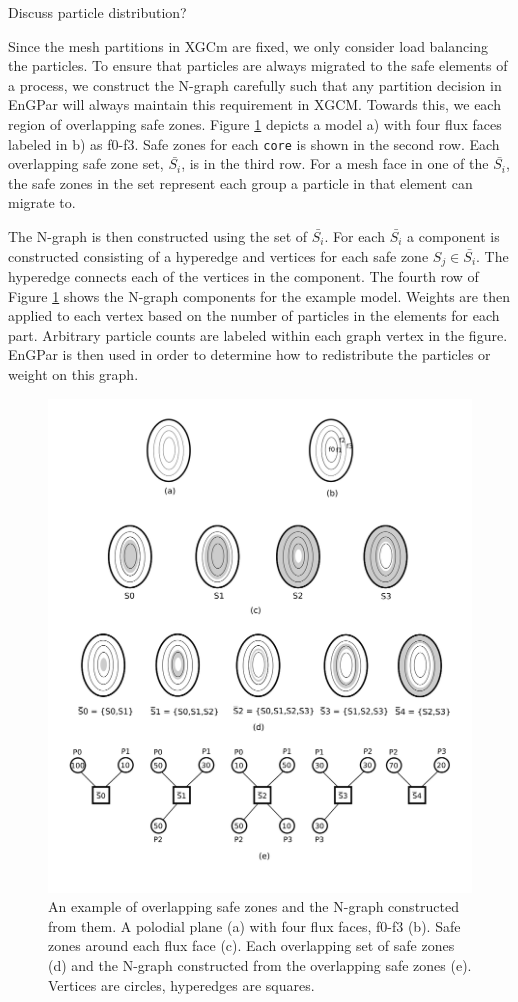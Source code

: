 \documentclass[conference]{IEEEtran}
\begin{document}
{\color{red} Discuss particle distribution?}

Since the mesh partitions in XGCm are fixed, we only consider
load balancing the particles. To ensure that particles are always migrated to the safe elements
of a process, we construct the N-graph carefully such that any partition
decision in EnGPar will always maintain this requirement in XGCM. Towards this, we each region
of overlapping safe zones. Figure \ref{fig:sbars} depicts a model a) with four flux faces labeled
in b) as f0-f3. Safe zones for each \texttt{core} is shown in the second row.
Each overlapping safe zone set, $\bar{S_i}$, is in the third row. For a mesh face in
one of the $\bar{S_i}$, the safe zones in the set represent each group a particle in that element
can migrate to.

The N-graph is then constructed using the set of $\bar{S_i}$. For each $\bar{S_i}$ a
component is constructed consisting of a hyperedge and vertices for each safe zone
$S_j \in \bar{S_i}$. The hyperedge connects each of the vertices in the component.
The fourth row of Figure \ref{fig:sbars} shows the N-graph components for the example model.
Weights are then applied to each vertex based on the number of particles in the elements
for each part. Arbitrary particle counts are labeled within each graph vertex in the figure.
EnGPar is then used in order to determine how to redistribute the particles or weight
on this graph.

\begin{figure}[!ht]
  \centering
  \includegraphics[width=.4\textwidth]{../figures/xgcm_ngraph_construction.png}
  \caption{An example of overlapping safe zones and the N-graph constructed from
  them. A polodial plane (a) with four flux faces, f0-f3 (b). Safe zones around each flux face (c). Each overlapping set of safe zones (d) and the N-graph constructed from the overlapping safe zones (e). Vertices are circles, hyperedges are squares.}
  \label{fig:sbars}
\end{figure}
\end{document}
